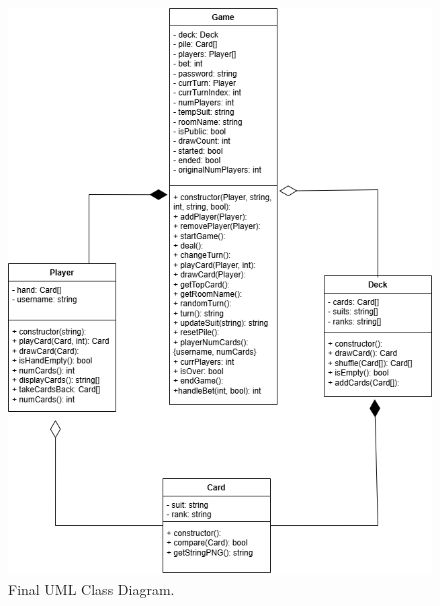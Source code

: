 \documentclass{article}
\begin{document}
\begin{figure}[h]
\centering
\includegraphics[width=\linewidth]{NewUML.png}
\caption{\label{fig:NewUML}Final UML Class Diagram.}
\end{figure}
\end{document}
